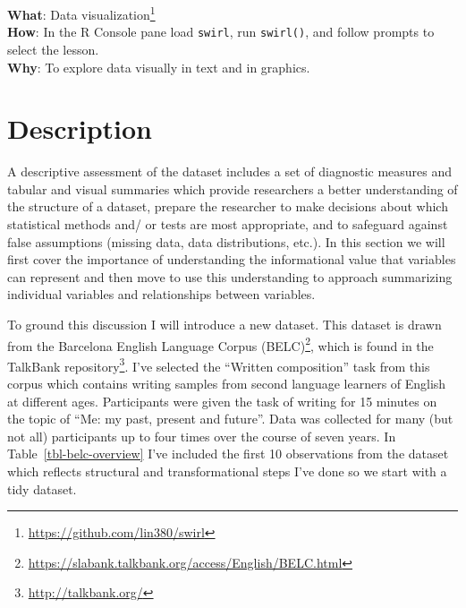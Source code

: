 \documentclass[
  letterpaper,
]{scrbook}
\DeclareRobustCommand{\href}[2]{#2\footnote{\url{#1}}}
\begin{document}
\begin{tcolorbox}[enhanced jigsaw, title=\textcolor{quarto-callout-tip-color}{\faLightbulb}\hspace{0.5em}{Interactive programming}, breakable, colback=white, colframe=quarto-callout-tip-color-frame, bottomrule=.15mm, left=2mm, bottomtitle=1mm, colbacktitle=quarto-callout-tip-color!10!white, opacityback=0, arc=.35mm, toprule=.15mm, coltitle=black, leftrule=.75mm, opacitybacktitle=0.6, toptitle=1mm, titlerule=0mm, rightrule=.15mm]

\textbf{What}: \href{https://github.com/lin380/swirl}{Data
visualization}\\
\textbf{How}: In the R Console pane load \texttt{swirl}, run
\texttt{swirl()}, and follow prompts to select the lesson.\\
\textbf{Why}: To explore data visually in text and in graphics.

\end{tcolorbox}

\hypertarget{description}{%
\section{Description}\label{description}}

A descriptive assessment of the dataset includes a set of diagnostic
measures and tabular and visual summaries which provide researchers a
better understanding of the structure of a dataset, prepare the
researcher to make decisions about which statistical methods and/ or
tests are most appropriate, and to safeguard against false assumptions
(missing data, data distributions, etc.). In this section we will first
cover the importance of understanding the informational value that
variables can represent and then move to use this understanding to
approach summarizing individual variables and relationships between
variables.

To ground this discussion I will introduce a new dataset. This dataset
is drawn from the
\href{https://slabank.talkbank.org/access/English/BELC.html}{Barcelona
English Language Corpus (BELC)}, which is found in the
\href{http://talkbank.org/}{TalkBank repository}. I've selected the
``Written composition'' task from this corpus which contains writing
samples from second language learners of English at different ages.
Participants were given the task of writing for 15 minutes on the topic
of ``Me: my past, present and future''. Data was collected for many (but
not all) participants up to four times over the course of seven years.
In Table~\ref{tbl-belc-overview} I've included the first 10 observations
from the dataset which reflects structural and transformational steps
I've done so we start with a tidy dataset.
\end{document}
